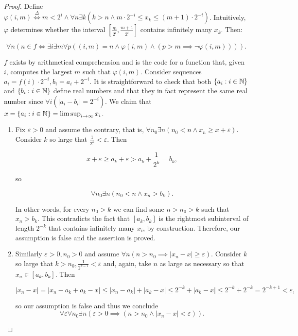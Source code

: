 \documentclass[../main.tex]{memoir}
\begin{document}
\begin{proof}

  Define $\varphi(i, m) \overset{\Delta}{\iff} m < 2^i \land \forall n \exists k (k > n \land m \cdot 2^{-i} \le x_k \le (m + 1) \cdot 2^{-i})$. Intuitively, $\varphi$ determines whether the interval $[\frac{m}{2^{i}}, \frac{m + 1}{2^{i}}]$ contains infinitely many $x_k$. Then:


  \[
    \forall n (
    n \in f \iff
    \exists i \exists m \forall p ((i, m) = n \land \varphi(i, m) \land (p > m \implies \neg\varphi(i, m)))
    ).
  \]

  $f$ exists by arithmetical comprehension and is the code for a function that, given $i$, computes the largest $m$ such that $\varphi(i, m)$. Consider sequences $a_i = f(i) \cdot 2^{-i}, b_i = a_i + 2^{-i}$. It is straightforward to check that both $\{a_i: i \in \mathbb{N}\}$ and $\{b_i: i \in \mathbb{N}\}$ define real numbers and that they in fact represent the same real number since $\forall i (|a_i - b_i| = 2^{-i})$. We claim that $x = \{a_i: i \in \mathbb{N}\} = \limsup_{i \to \infty} x_i$.

  \begin{enumerate}
  \item Fix $\varepsilon > 0$ and assume the contrary, that is, $\forall n_0 \exists n (n_0 < n \land x_n \ge x + \varepsilon)$. Consider $k$ so large that $\frac{1}{2^k} < \varepsilon$. Then

    \[ x + \varepsilon \ge a_k + \varepsilon > a_k + \frac{1}{2^k} = b_k, \]

    so

    \[ \forall n_0 \exists n (n_0 < n \land x_n > b_k). \]

    In other words, for every $n_0 > k$ we can find some $n > n_0 > k$ such that $x_n > b_k$. This contradicts the fact that $[a_k, b_k]$ is the rightmost subinterval of length $2^{-k}$ that contains infinitely many $x_i$, by construction. Therefore, our assumption is false and the assertion is proved.
  \item Similarly $\varepsilon > 0, n_0 > 0$ and assume $\forall n (n > n_0 \implies |x_n - x| \ge \varepsilon)$. Consider $k$ so large that $k > n_0, \frac{1}{2^{k - 1}} < \varepsilon$ and, again, take $n$ as large as necessary so that $x_n \in [a_k, b_k]$. Then

    \[ |x_n - x| = |x_n - a_k + a_k - x| \le |x_n - a_k| + |a_k - x| \le 2^{-k} + |a_k - x| \le 2^{-k} + 2^{-k} = 2^{-k + 1} < \varepsilon, \]

    so our assumption is false and thus we conclude
    \[ \forall \varepsilon \forall n_0 \exists n (\varepsilon > 0 \implies (n > n_0 \land |x_n - x| < \varepsilon)). \]
  \end{enumerate}


\end{proof}
\end{document}
